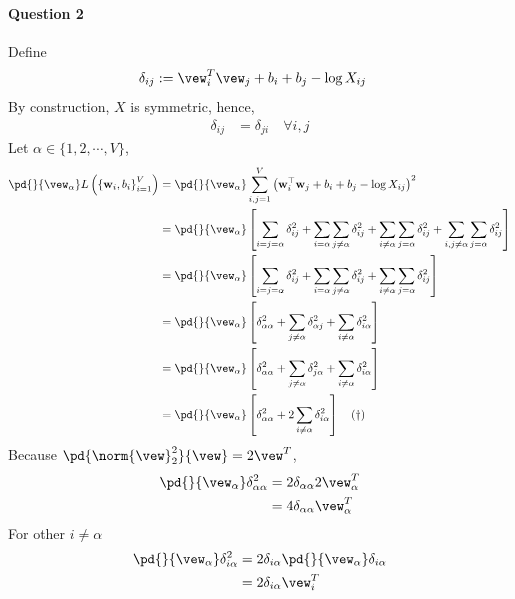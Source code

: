 \documentclass{article}
\begin{document}
    \paragraph{Question 2}
    Define
    \begin{align}
    	\delta_{ij} &:= \vew_i^T \vew_j + b_i + b_j - \log X_{ij}
    \end{align}
    By construction, $X$ is symmetric, hence,
    \begin{align}
    	\delta_{ij} &= \delta_{ji}\quad \forall i, j
    \end{align}
    Let $\alpha \in \{1, 2, \cdots, V\}$,
    \begin{align}
    	\pd{}{\vew_\alpha} L\left(\left\{\mathbf{w}_{i}, b_{i}\right\}_{i=1}^{V}\right) 
    	&= \pd{}{\vew_\alpha} \sum_{i, j=1}^{V}\left(\mathbf{w}_{i}^{\top} \mathbf{w}_{j}+b_{i}+b_{j}-\log X_{i j}\right)^{2} \\
    	&= \pd{}{\vew_\alpha} \left[\sum_{i=j=\alpha} \delta_{ij}^2 
    	+ \sum_{i=\alpha} \sum_{j\neq\alpha} \delta_{ij}^2
		+ \sum_{i\neq\alpha} \sum_{j=\alpha}\delta_{ij}^2
		+ \sum_{i, j \neq \alpha} \sum_{j=\alpha}\delta_{ij}^2 \right] \\
		&= \pd{}{\vew_\alpha} \left[\sum_{i=j=\alpha} \delta_{ij}^2 
    	+ \sum_{i=\alpha} \sum_{j\neq\alpha} \delta_{ij}^2
		+ \sum_{i\neq\alpha} \sum_{j=\alpha}\delta_{ij}^2
		\right] \\
		&= \pd{}{\vew_\alpha}\left[ \delta_{\alpha \alpha}^2 
    	+ \sum_{j\neq\alpha} \delta_{\alpha j}^2
		+ \sum_{i\neq\alpha} \delta_{i \alpha}^2
		\right] \\
		&= \pd{}{\vew_\alpha}\left[ \delta_{\alpha \alpha}^2 
    	+ \sum_{j\neq\alpha} \delta_{j \alpha}^2
		+ \sum_{i\neq\alpha} \delta_{i \alpha}^2
		\right] \\
		&= \pd{}{\vew_\alpha}\left[ \delta_{\alpha \alpha}^2 
		+ 2 \sum_{i\neq\alpha} \delta_{i \alpha}^2
		\right] \quad (\dagger)
    \end{align}
    Because $\pd{\norm{\vew}_2^2}{\vew} = 2 \vew^T$,
    \begin{align}
    	\pd{}{\vew_\alpha} \delta_{\alpha \alpha}^2 &= 2 \delta_{\alpha \alpha} 2 \vew_\alpha^T \\
    	&= 4 \delta_{\alpha \alpha} \vew_\alpha^T
    \end{align}
    For other $i \neq \alpha$
    \begin{align}
    	\pd{}{\vew_\alpha} \delta_{i \alpha}^2 &= 2 \delta_{i\alpha} \pd{}{\vew_\alpha} \delta_{i\alpha} \\
    	&= 2 \delta_{i \alpha} \vew_i^T
    \end{align}
\end{document}

